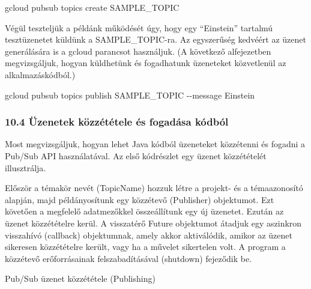 \documentclass[
]{article}
\newenvironment{Shaded}{}{}
\newcommand{\AttributeTok}[1]{\textcolor[rgb]{0.49,0.56,0.16}{#1}}
\newcommand{\ExtensionTok}[1]{#1}
\newcommand{\NormalTok}[1]{#1}
\begin{document}
\begin{Shaded}
\begin{Highlighting}[]
\ExtensionTok{gcloud}\NormalTok{ pubsub topics create SAMPLE\_TOPIC}
\end{Highlighting}
\end{Shaded}

Végül teszteljük a példánk működését úgy, hogy egy ``Einstein'' tartalmú
tesztüzenetet küldünk a SAMPLE\_TOPIC-ra. Az egyszerűség kedvéért az
üzenet generálására is a gcloud parancsot használjuk. (A következő
alfejezetben megvizsgáljuk, hogyan küldhetünk és fogadhatunk üzeneteket
közvetlenül az alkalmazáskódból.)

\begin{Shaded}
\begin{Highlighting}[]
\ExtensionTok{gcloud}\NormalTok{ pubsub topics publish SAMPLE\_TOPIC }\AttributeTok{{-}{-}message}\NormalTok{ Einstein}
\end{Highlighting}
\end{Shaded}

\hypertarget{uxfczenetek-kuxf6zzuxe9tuxe9tele-uxe9s-fogaduxe1sa-kuxf3dbuxf3l}{%
\subsubsection{10.4 Üzenetek közzététele és fogadása
kódból}\label{uxfczenetek-kuxf6zzuxe9tuxe9tele-uxe9s-fogaduxe1sa-kuxf3dbuxf3l}}

Most megvizsgáljuk, hogyan lehet Java kódból üzeneteket közzétenni és
fogadni a Pub/Sub API használatával. Az első kódrészlet egy üzenet
közzétételét illusztrálja.

Először a témakör nevét (TopicName) hozzuk létre a projekt- és a
témaazonosító alapján, majd példányosítunk egy közzétevő (Publisher)
objektumot. Ezt követően a megfelelő adatmezőkkel összeállítunk egy új
üzenetet. Ezután az üzenet közzétételre kerül. A visszatérő Future
objektumot átadjuk egy aszinkron visszahívó (callback) objektumnak,
amely akkor aktiválódik, amikor az üzenet sikeresen közzétételre került,
vagy ha a művelet sikertelen volt. A program a közzétevő erőforrásainak
felszabadításával (shutdown) fejeződik be.

Pub/Sub üzenet közzététele (Publishing)
\end{document}
